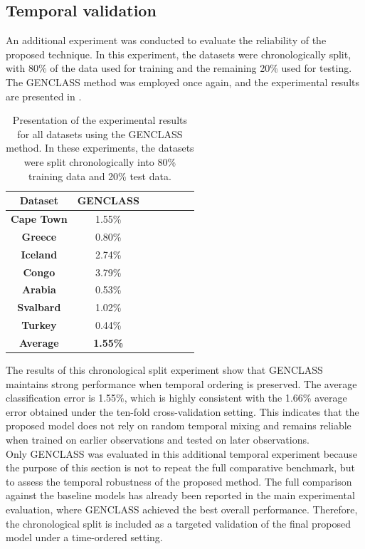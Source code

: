\documentclass[12pt]{Definitions/academia}
\begin{document}
\subsection{Temporal validation}
An additional experiment was conducted to evaluate the reliability of the proposed technique. In this experiment, the datasets were chronologically split, with 80\% of the data used for training and the remaining 20\% used for testing. The GENCLASS method was employed once again, and the experimental results are presented in  .
\begin{table}[H]
	\centering
\begin{tabular}{|c|c|c|c|c|c|c|}
\hline
\textbf{Dataset} &
\centering
GENCLASS\tabularnewline
\hline
\hline
\textbf{Cape Town} & 1.55\% \tabularnewline
\hline
\textbf{Greece} & 0.80\% \tabularnewline
\hline
\textbf{Iceland} & 2.74\% \tabularnewline
\hline
\textbf{Congo} & 3.79\% \tabularnewline
\hline
\textbf{Arabia} & 0.53\% \tabularnewline
\hline
\textbf{Svalbard} & 1.02\%\tabularnewline
\hline
\textbf{Turkey} & 0.44\% \tabularnewline
\hline
\textbf{Average} & \textbf{1.55\%} \tabularnewline
\hline
\end{tabular}
\vspace{1em}
\caption{Presentation of the experimental results for all datasets using the GENCLASS method. In these experiments, the datasets were split chronologically into 80\% training data and 20\% test data.\label{tab:table10}}
\end{table}
The results of this chronological split experiment show that GENCLASS maintains strong performance when temporal ordering is preserved. The average classification error is 1.55\%, which is highly consistent with the 1.66\% average error obtained under the ten-fold cross-validation setting. This indicates that the proposed model does not rely on random temporal mixing and remains reliable when trained on earlier observations and tested on later observations.
\\
Only GENCLASS was evaluated in this additional temporal experiment because the purpose of this section is not to repeat the full comparative benchmark, but to assess the temporal robustness of the proposed method. The full comparison against the baseline models has already been reported in the main experimental evaluation, where GENCLASS achieved the best overall performance. Therefore, the chronological split is included as a targeted validation of the final proposed model under a time-ordered setting.


\clearpage
\end{document}
